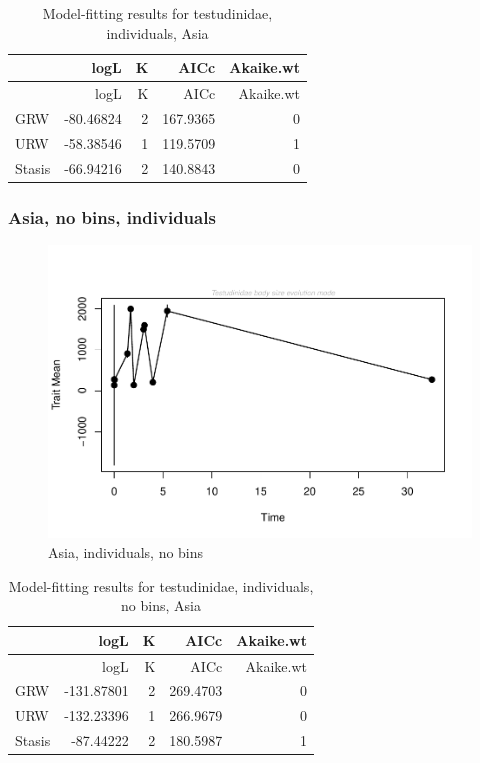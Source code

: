 \documentclass[]{article}
\begin{document}
\begin{longtable}[]{@{}lrrrr@{}}
\caption{Model-fitting results for testudinidae, individuals,
Asia}\tabularnewline
\toprule
& logL & K & AICc & Akaike.wt\tabularnewline
\midrule
\endfirsthead
\toprule
& logL & K & AICc & Akaike.wt\tabularnewline
\midrule
\endhead
GRW & -80.46824 & 2 & 167.9365 & 0\tabularnewline
URW & -58.38546 & 1 & 119.5709 & 1\tabularnewline
Stasis & -66.94216 & 2 & 140.8843 & 0\tabularnewline
\bottomrule
\end{longtable}

\newpage

\subsubsection{Asia, no bins,
individuals}\label{asia-no-bins-individuals}

\begin{figure}[htbp]
\centering
\includegraphics{MA_JJ_files/figure-latex/paleoTS, no bins individuals, Asia-1.pdf}
\caption{Asia, individuals, no bins}
\end{figure}

\begin{longtable}[]{@{}lrrrr@{}}
\caption{Model-fitting results for testudinidae, individuals, no bins,
Asia}\tabularnewline
\toprule
& logL & K & AICc & Akaike.wt\tabularnewline
\midrule
\endfirsthead
\toprule
& logL & K & AICc & Akaike.wt\tabularnewline
\midrule
\endhead
GRW & -131.87801 & 2 & 269.4703 & 0\tabularnewline
URW & -132.23396 & 1 & 266.9679 & 0\tabularnewline
Stasis & -87.44222 & 2 & 180.5987 & 1\tabularnewline
\bottomrule
\end{longtable}
\end{document}
